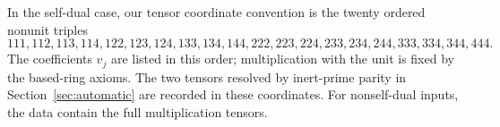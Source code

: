 In the self-dual case, our tensor coordinate convention is the twenty
ordered nonunit triples
\[
111,112,113,114,122,123,124,133,134,144,
222,223,224,233,234,244,333,334,344,444.
\]
The coefficients $v_j$ are listed in this order; multiplication with the
unit is fixed by the based-ring axioms. The two tensors resolved by
inert-prime parity in
Section~\ref{sec:automatic} are recorded in these coordinates. For
nonself-dual inputs, the data contain the full multiplication tensors.



